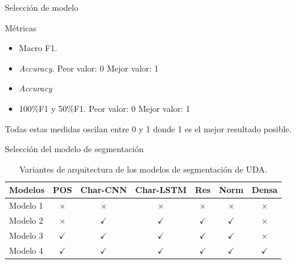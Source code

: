 \documentclass{beamer}
\begin{document}
\begin{frame}{Selección de modelo}

    \pause
    \begin{block}{Métricas}
        \begin{itemize}
            \pause
            \item Macro F1.
            \pause
            \item \textit{Accuracy}. Peor valor: 0 Mejor valor: 1
            \pause
            \item \emph{Accuracy}
            \pause
            \item 100\%F1 y 50\%F1. Peor valor: 0 Mejor valor: 1
        \end{itemize}
    \end{block}

    \pause
    Todas estas medidas oscilan entre 0 y 1 donde 1 es el mejor resultado posible.

\end{frame}

\begin{frame}{Selección del modelo de segmentación}
    \begin{table}
        \begin{center}
            \begin{tabular}{|l|c|c|c|c|c|c|} \hline
            Modelos 		& POS       & Char-CNN  & Char-LSTM & Res       & Norm      & Densa  \\ \hline
            Modelo 1		& $\times$	& $\times$    & $\times$    & $\times$	& $\times$    & $\times$ \\ \hline
            Modelo 2		& $\times$	& $\checkmark$    & $\checkmark$    & $\checkmark$	& $\checkmark$    & $\times$ \\ \hline
            Modelo 3		& $\checkmark$	& $\checkmark$    & $\checkmark$    & $\checkmark$	& $\checkmark$    & $\times$ \\ \hline
            Modelo 4		& $\checkmark$	& $\checkmark$    & $\checkmark$    & $\checkmark$	& $\checkmark$    & $\checkmark$ \\ \hline
            \end{tabular}
        \caption{Variantes de arquitectura de los modelos de segmentación de UDA.}
        \end{center}
    \end{table}
\end{frame}
\end{document}
